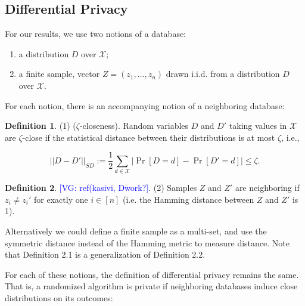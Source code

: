 \documentclass[format = sigconf]{acmart}
\newcommand{\vg}[1]{\textcolor{blue}{[VG: #1]}}
\newcommand{\X}{\mathcal{X}}
\newcommand{\1}{\mathbbm{1}}
\newcommand{\zt}{\zeta}
\newcommand{\zya}{Z_{ya}}
\theoremstyle{definition}
\newtheorem{defn}{Definition}[section]
\begin{document}

\subsection{Differential Privacy}
For our results, we use two notions of a database:
\begin{enumerate}
	\item a distribution $D$ over $\X$;
	\item a finite sample, vector $Z = (z_1, ..., z_n)$ drawn i.i.d. from a distribution $D$ over $\X$.
\end{enumerate}
For each notion, there is an accompanying notion of a neighboring database:
\begin{defn}
	(1) ($\zt$-closeness). Random variables $D$ and $D'$ taking values in $\X$ are $\zt$-close if the statistical distance between their distributions is at most $\zt$, i.e.,

	$$ ||D-D'||_{\textit{SD}} :=\frac{1}{2}\sum_{d\in \mathcal{X}} |\Pr[D=d] - \Pr[D'=d]| \leq \zeta.$$
\end{defn}

\begin{defn} \vg{ref(kasivi, Dwork?}.
(2) Samples $Z$ and $Z'$ are neighboring if $z_i \neq z_i'$ for exactly one $i \in [n]$ (i.e. the Hamming distance between $Z$ and $Z'$ is 1).
\end{defn}
Alternatively we could define a finite sample as a multi-set, and use the symmetric distance instead of the Hamming metric to measure distance. Note that Definition 2.1 is a generalization of Definition 2.2.

For each of these notions, the definition of differential privacy remains the same. That is, a randomized algorithm is private if neighboring databases induce close distributions on its outcomes:
\end{document}

